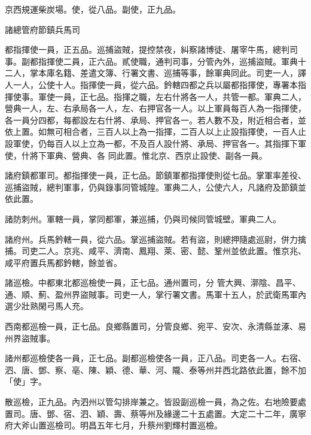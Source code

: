 \begin{pinyinscope}
 京西規運柴炭場。使，從八品。副使，正九品。



 諸總管府節鎮兵馬司



 都指揮使一員，正五品。巡捕盜賊，提控禁夜，糾察諸博徒、屠宰牛馬，總判司事。副都指揮使二員，正六品。貳使職，通判司事，分管內外，巡捕盜賊。軍典十二人，掌本庫名籍、差遣文簿、行署文書、巡捕等事，餘軍典同此。司吏一人，譯人一人，公使十人。指揮使一員，從六品。鈐轄四都之兵以屬都指揮使，專署本指揮使事。軍使一員，正七品。指揮之職，左右什將各一人，共管一都。軍典二人，營典一人，左、右承局各一人，左、右押官各一人。以上軍員每百人為一指揮使，各一員分四都，每都設左右什將、承局、押官各一。若人數不及，附近相合者，並依上置。如無可相合者，三百人以上為一指揮，二百人以上止設指揮使，一百人止設軍使，仍每百人以上立為一都，不及百人設什將、承局、押官各一。其指揮下軍使，什將下軍典、營典、各
 同此置。惟北京、西京止設使、副各一員。



 諸府鎮都軍司。都指揮使一員，正七品。節鎮軍都指揮使則從七品。掌軍率差役、巡捕盜賊，總判軍事，仍與錄事同管城隍。軍典二人，公使六人，凡諸府及節鎮並依此置。



 諸防刺州。軍轄一員，掌同都軍，兼巡捕，仍與司候同管城壁。軍典二人。



 諸府州。兵馬鈐轄一員，從六品。掌巡捕盜賊。若有盜，則總押隨處巡尉，併力擒捕。司吏二人。京兆、咸平、濟南、鳳翔、萊、密、懿、鞏州並依此置。惟京兆、咸平府置兵馬都鈐轄，餘並省。



 諸巡檢。中都東北都巡檢使一員，正七品。通州置司，分
 管大興、漷陰、昌平、通、順、薊、盈州界盜賊事。司吏一人，掌行署文書。馬軍十五人，於武衛馬軍內選少壯熟閑弓馬人充。



 西南都巡檢一員，正七品。良鄉縣置司，分管良鄉、宛平、安次、永清縣並涿、易州界盜賊事。



 諸州都巡檢使各一員，正七品。副都巡檢使各一員，正八品。司吏各一人。右宿、泗、唐、鄧、察、亳、陳、穎、德、華、河、隴、泰等州并西北路依此置，餘不加「使」字。



 散巡檢，正九品。內泗州以管勾排岸兼之。皆設副巡檢一員，為之佐。右地險要處置司。唐、鄧、宿、泗、穎、壽、蔡等州及緣邊二十五處置。大定二十二年，廣寧府大斧山置巡檢司。明昌五年七月，升蔡州劉輝村置巡檢。




\end{pinyinscope}
